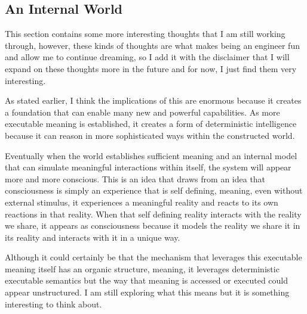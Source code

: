 \subsection{An Internal World}

This section contains some more interesting thoughts that I am still working through, however, these kinds of thoughts are what makes being an engineer fun and allow me to continue dreaming, so I add it with the disclaimer that I will expand on these thoughts more in the future and for now, I just find them very interesting.

As stated earlier, I think the implications of this are enormous because it creates a foundation that can enable many new and powerful capabilities. As more executable meaning is established, it creates a form of deterministic intelligence because it can reason in more sophisticated ways within the constructed world. 

Eventually when the world establishes sufficient meaning and an internal model that can simulate meaningful interactions within itself, the system will appear more and more conscious. This is an idea that draws from an idea that consciousness is simply an experience that is self defining, meaning, even without external stimulus, it experiences a meaningful reality and reacts to its own reactions in that reality. When that self defining reality interacts with the reality we share, it appears as consciousness because it models the reality we share it in its reality and interacts with it in a unique way. 

Although it could certainly be that the mechanism that leverages this executable meaning itself has an organic structure, meaning, it leverages deterministic executable semantics but the way that meaning is accessed or executed could appear unstructured. I am still exploring what this means but it is something interesting to think about. 